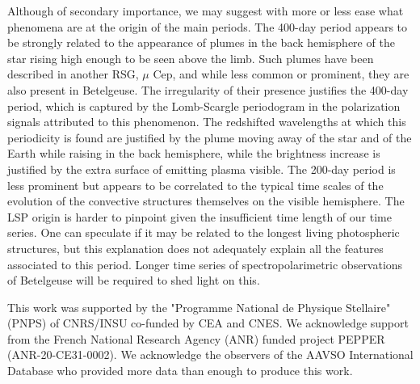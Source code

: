 \documentclass{aa}
\begin{document}
Although of secondary importance, we may suggest with more or less ease what phenomena are at the origin of the main periods. The 400-day period 
appears to be strongly related to the appearance of plumes in the back hemisphere of the star rising high enough to be seen above the limb.
Such plumes have been described in another RSG, $\mu$ Cep, and while less common or prominent, they are also present in Betelgeuse. The irregularity 
of their presence justifies the 400-day period, which is captured by the Lomb-Scargle periodogram in the polarization signals attributed to 
this phenomenon. The redshifted wavelengths at which this periodicity is found are justified by the plume moving away of the star and of the Earth while 
raising in the back hemisphere, while the brightness increase is justified by the extra surface of emitting plasma visible. The 200-day period is less 
prominent but appears to be correlated to the typical time scales of the evolution of the convective structures themselves on the visible hemisphere. 
The LSP origin is harder to pinpoint given the insufficient time length of our time series. One can speculate if it may be related to the 
longest living photospheric structures, but this explanation does not adequately explain all the features associated to this period. Longer time 
series of spectropolarimetric observations of Betelgeuse will be required to shed light on this.




\begin{acknowledgements}
    This work was supported by the "Programme National de Physique Stellaire" (PNPS) of CNRS/INSU co-funded by CEA and CNES.
    We acknowledge support from the French National Research Agency (ANR)
    funded project PEPPER (ANR-20-CE31-0002).
    We acknowledge the observers of the AAVSO International Database who provided more data than enough to produce this work.
    
    \end{acknowledgements}
    
    
    
    
\end{document}

